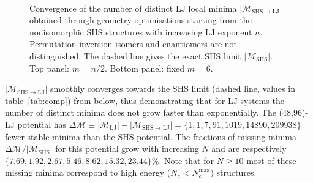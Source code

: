 \begin{figure}
    \centering
    \\
    \caption{
    Convergence of the number of distinct LJ local minima
    $|\mathcal{M}_\mathrm{SHS\to LJ}|$ obtained through geometry
    optimisations starting from the nonisomorphic \acs{SHS} structures with
    increasing LJ exponent $n$.  Permutation-inversion isomers and enantiomers
    are not distinguished.     The dashed line gives the exact \acs{SHS} limit
    $|\mathcal{M}_\mathrm{SHS}|$.  Top panel: $m=n/2$. Bottom panel: fixed
    $m=6$.}
    \label{fig:expinfty}
\end{figure}

$|\mathcal{M}_\mathrm{SHS\to LJ}|$ smoothly  converges towards the \ac{SHS} limit (dashed line, values in table~\ref{tab:comp}) from below, 
thus demonstrating that for LJ systems the number of distinct minima does not grow faster than exponentially.  
The (48,96)-LJ potential has $\Delta\mathcal{M} \equiv |\mathcal{M}_\mathrm{LJ}| - |\mathcal{M}_\mathrm{SHS\to LJ}| = \{1,1,7,91,1019,14890,209938\}$ fewer stable minima than the \ac{SHS} potential.
The fractions of missing minima $\Delta\mathcal{M}/|\mathcal{M}_\mathrm{SHS}|$ for this potential grow with increasing $N$ and are respectively $\{7.69,1.92,2.67,5.46,8.62,15.32,23.44\}\%$.  Note that for $N \geq 10$ most of these missing minima correspond to high energy ($N_c < N_c^\mathrm{max}$) structures.


